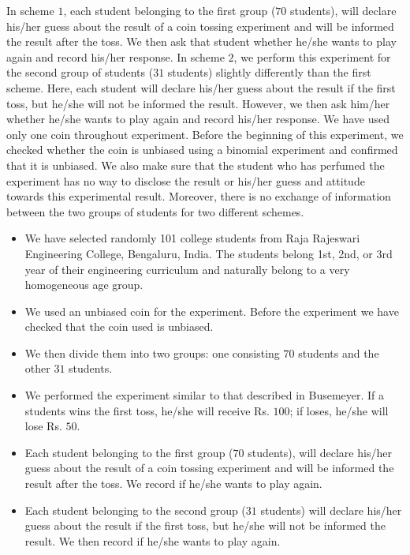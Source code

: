 \documentclass[review]{elsarticle}
\begin{document}
In scheme $1$, each student belonging to the first group ($70$ students), will declare his/her guess about the result of a coin tossing experiment and will be informed the result after the toss. We then ask that student whether he/she wants to play again and record his/her response. In scheme $2$, we perform this experiment for the second group of students ($31$ students) slightly differently than the first scheme. Here, each student will declare his/her guess about the result if the first toss, but he/she will not be informed the result. However, we then ask him/her whether he/she wants to play again and record his/her response. We have used only one coin throughout experiment. Before the beginning of this experiment, we checked whether the coin is unbiased using a binomial experiment and confirmed that it is unbiased. We also make sure that the student who has perfumed the experiment has no way to disclose the result or his/her guess and attitude towards this experimental result. Moreover, there is no exchange of information between the two groups of students for two different schemes.


\begin{itemize}
\item 	We have selected randomly 101 college students from Raja Rajeswari Engineering College, Bengaluru, India. The students belong 1st, 2nd, or 3rd year of their engineering curriculum and naturally belong to a very homogeneous age group.
\item 	We used an unbiased coin for the experiment. Before the experiment we have checked that the coin used is unbiased.
\item We then divide them into two groups: one consisting $70$ students and the other $31$ students.
\item We performed the experiment similar to that described in Busemeyer. If a students wins the first toss, he/she will receive Rs. $100$; if loses, he/she will lose Rs. $50$.
\item Each student belonging to the first group ($70$ students), will declare his/her guess about the result of a coin tossing experiment and will be informed the result after the toss. We record if he/she wants to play again.
\item Each student belonging to the second group ($31$ students) will declare his/her guess about the result if the first toss, but he/she will not be informed the result. We then record if he/she wants to play again.
\end{itemize}
\noindent
\end{document}
